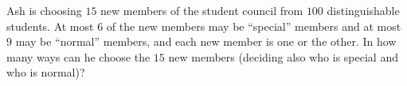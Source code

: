 Ash is choosing $15$ new members of the student council from $100$ distinguishable students. At most $6$ of the new members may be ``special'' members and at most $9$ may be ``normal'' members, and each new member is one or the other. In how many ways can he choose the $15$ new members (deciding also who is special and who is normal)?
